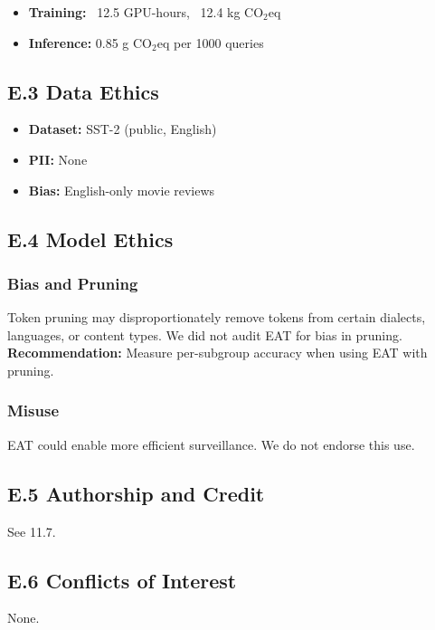 \begin{itemize}
\item \textbf{Training:} ~12.5 GPU-hours, ~12.4 kg CO$_2$eq
\item \textbf{Inference:} 0.85 g CO$_2$eq per 1000 queries

\end{itemize}
\subsection{E.3 Data Ethics}

\begin{itemize}
\item \textbf{Dataset:} SST-2 (public, English)
\item \textbf{PII:} None
\item \textbf{Bias:} English-only movie reviews

\end{itemize}
\subsection{E.4 Model Ethics}

\subsubsection{Bias and Pruning}

Token pruning may disproportionately remove tokens from certain dialects, 
languages, or content types. We did not audit EAT for bias in pruning. 
\textbf{Recommendation:} Measure per-subgroup accuracy when using EAT with 
pruning.

\subsubsection{Misuse}

EAT could enable more efficient surveillance. We do not endorse this use.

\subsection{E.5 Authorship and Credit}

See  11.7.

\subsection{E.6 Conflicts of Interest}

None.

